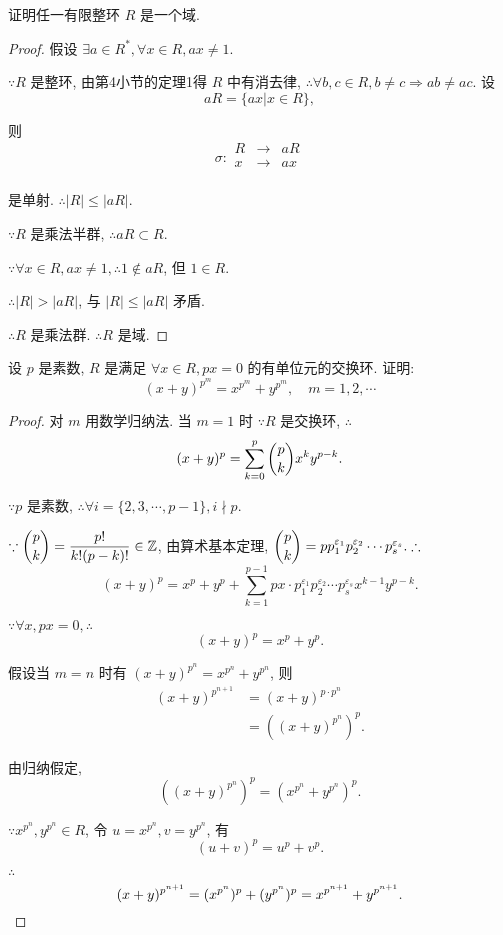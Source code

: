 \documentclass[color=black,device=normal,lang=cn,mode=geye]{elegantnote}
\begin{document}
\begin{exercise}\label{ex3.5}
    证明任一有限整环 $R$ 是一个域.
\end{exercise}
\begin{proof}
    假设 $\exists a\in R^*,\forall x\in R,ax\neq1$.

    $\because R$ 是整环, 由第4小节的定理1得 $R$ 中有消去律, $\therefore\forall b,c\in R,b\neq c\Rightarrow ab\neq ac$. 设
    \[aR=\{ax|x\in R\},\]

    则
    \[\sigma:\begin{array}{rcl}
        R & \to & aR \\
        x & \to & ax \\
    \end{array}\]

    是单射. $\therefore|R|\leq|aR|$.

    $\because R$ 是乘法半群, $\therefore aR\subset R$.

    $\because\forall x\in R,ax\neq1,\therefore1\notin aR$, 但 $1\in R$.

    $\therefore|R|>|aR|$, 与 $|R|\leq|aR|$ 矛盾.

    $\therefore R$ 是乘法群. $\therefore R$ 是域.
\end{proof}
\begin{exercise}%
    设 $p$ 是素数, $R$ 是满足 $\forall x\in R,px=0$ 的有单位元的交换环. 证明:
    \[(x+y)^{p^m}=x^{p^m}+y^{p^m},\quad m=1,2,\cdots\]
\end{exercise}
\begin{proof}
    对 $m$ 用数学归纳法. 当 $m=1$ 时 $\because R$ 是交换环, $\therefore$
    \[(x+y)^p=\sum_{k=0}^p\dbinom{p}{k}x^ky^{p-k}.\]

    $\because p$ 是素数, $\therefore\forall i=\{2,3,\cdots,p-1\},i\nmid p$.

    $\because\dbinom{p}{k}=\dfrac{p!}{k!(p-k)!}\in\mathbb{Z}$, 由算术基本定理, $\dbinom{p}{k}=pp_1^{\varepsilon_1}p_2^{\varepsilon_2}\cdots p_s^{\varepsilon_s}.\therefore$
    \[(x+y)^p=x^p+y^p+\sum_{k=1}^{p-1}px\cdot p_1^{\varepsilon_1}p_2^{\varepsilon_2}\cdots p_s^{\varepsilon_s}x^{k-1}y^{p-k}.\]

    $\because\forall x,px=0,\therefore$
    \[(x+y)^p=x^p+y^p.\]

    假设当 $m=n$ 时有 $(x+y)^{p^n}=x^{p^n}+y^{p^n}$, 则
    \begin{align*}
        (x+y)^{p^{n+1}} & =(x+y)^{p\cdot p^n} \\
        & =((x+y)^{p^n})^p.
    \end{align*}

    由归纳假定,
    \[((x+y)^{p^n})^p=(x^{p^n}+y^{p^n})^p.\]

    $\because x^{p^n},y^{p^n}\in R$, 令 $u=x^{p^n},v=y^{p^n}$, 有
    \[(u+v)^p=u^p+v^p.\]

    $\therefore$
    \[(x+y)^{p^{n+1}}=(x^{p^n})^p+(y^{p^n})^p=x^{p^{n+1}}+y^{p^{n+1}}.\qedhere\]
\end{proof}
\end{document}
